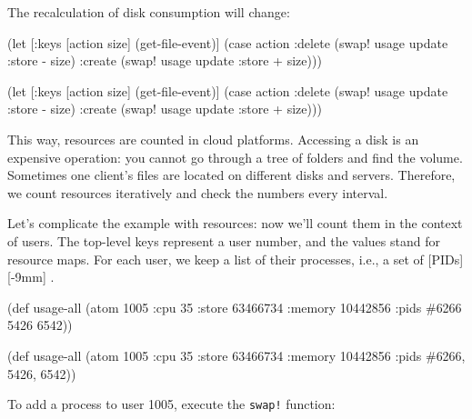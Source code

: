 \noindent
The recalculation of disk consumption will change:

\ifx\DEVICETYPE\MOBILE

\begin{clojure}
(let [{:keys [action size]}
      (get-file-event)]
  (case action
    :delete
    (swap! usage update :store - size)
    :create
    (swap! usage update :store + size)))
\end{clojure}

\else

\begin{clojure}
(let [{:keys [action size]} (get-file-event)]
  (case action
    :delete
    (swap! usage update :store - size)
    :create
    (swap! usage update :store + size)))
\end{clojure}

\fi


This way, resources are counted in cloud platforms.
Accessing a disk is an expensive operation: you cannot go through a tree of folders and find the volume.
Sometimes one client's files are located on different disks and servers. Therefore, we count resources iteratively and check the numbers every interval.


Let's complicate the example with resources: now we'll count them in the context of users.
The top-level keys represent a user number, and the values stand for resource maps.
For each user, we keep a list of their processes, i.e., a set of [PIDs][-9mm]
.

\ifx\DEVICETYPE\MOBILE
\begin{clojure/lines}
(def usage-all
  (atom {1005 {:cpu 35
               :store 63466734
               :memory 10442856
               :pids #{6266 5426
                       6542}}}))
\end{clojure/lines}

\else

\begin{clojure/lines}
(def usage-all
  (atom {1005 {:cpu 35
               :store 63466734
               :memory 10442856
               :pids #{6266, 5426, 6542}}}))
\end{clojure/lines}
\fi

To add a process to user 1005, execute the \verb|swap!| function:

\ifx\DEVICETYPE\MOBILE

